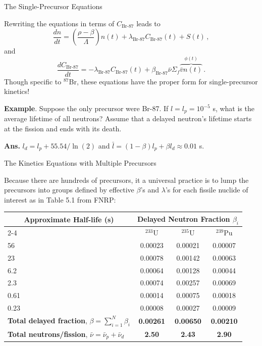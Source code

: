 \documentclass[aspectratio=1610]{beamer}
\begin{document}
\begin{frame}[fragile]{The Single-Precursor Equations}

Rewriting the equations in terms of $ C_{\text{Br-87}}$ leads to
\begin{equation*}
\boxed{
  \frac{dn}{dt} = \left ( \frac{\rho - \beta}{\Lambda} \right ) n(t) +  \lambda_{\text{Br-87}} C_{\text{Br-87}} (t) + S(t)}  \, ,
\end{equation*}
and
\begin{equation*}
  \boxed{\frac{d C_{\text{Br-87}}}{dt} = -\lambda_{\text{Br-87}} C_{\text{Br-87}}(t) + \beta_{\text{Br-87}} \bar{\nu} \Sigma_f \overbrace{\bar{v}n(t)}^{\phi(t)} }\, .
\end{equation*}
Though specific to ${}^{87}$Br, these equations have the proper form for single-precursor kinetics!

\vfill 
\pause 

{\bf Example}. Suppose the only precursor were Br-87.  If $l = l_p = 10^{-5}$ s, what is the average lifetime of all neutrons? Assume that a delayed neutron's lifetime starts at the fission and ends with its death.

\pause 

\textcolor{wcprimary}{{\small {\bf Ans.} $l_d = l_p + 55.54/\ln(2)$ and 
$\bar{l} = (1-\beta) l_p + \beta l_d\approx 0.01$ s.
}}

\end{frame}

\begin{frame}[fragile]{The Kinetics Equations with Multiple Precursors}

Because there are hundreds of precursors, it a universal practice is to lump the precursors into groups defined by effective $\beta$'s and $\lambda$'s for each fissile nuclide of interest as in Table 5.1 from FNRP:

\begin{table}[h!]
\begin{tabular}{lccc}
\toprule
\multicolumn{1}{c}{\textbf{Approximate Half-life (s)}} & 
\multicolumn{3}{c}{\textbf{Delayed Neutron Fraction} $\beta_i$} \\
\cmidrule(lr){2-4}
 & $^{233}$U & $^{235}$U & $^{239}$Pu \\
\midrule
56   & 0.00023 & 0.00021 & 0.00007 \\
23   & 0.00078 & 0.00142 & 0.00063 \\
6.2  & 0.00064 & 0.00128 & 0.00044 \\
2.3  & 0.00074 & 0.00257 & 0.00069 \\
0.61 & 0.00014 & 0.00075 & 0.00018 \\
0.23 & 0.00008 & 0.00027 & 0.00009 \\
\midrule
\textbf{Total delayed fraction}, $\beta = \sum^N_{i=1} \beta_i$  & 
  \textbf{0.00261} & \textbf{0.00650} & \textbf{0.00210} \\
\textbf{Total neutrons/fission}, $\bar{\nu} = \bar{\nu}_p + \bar{\nu}_d $ & 
  \textbf{2.50} & \textbf{2.43} & \textbf{2.90} \\
\bottomrule
\end{tabular}
\end{table}

\end{frame}
\end{document}
